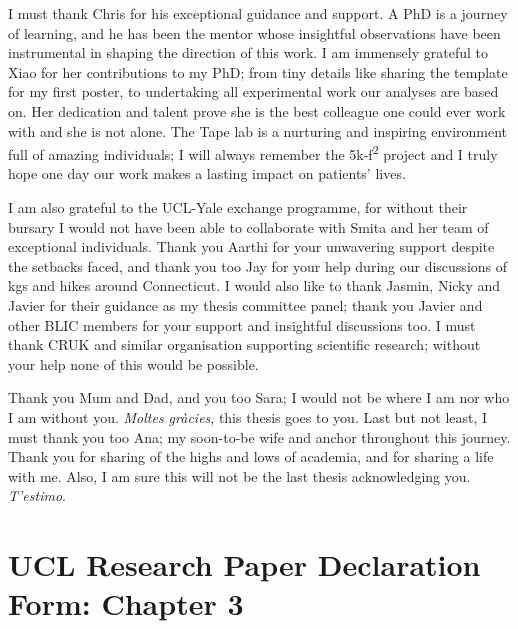         
\begin{acknowledgements}

I must thank Chris for his exceptional guidance and support. A PhD is a journey of learning, and he has been the mentor whose insightful observations have been instrumental in shaping the direction of this work.
I am immensely grateful to Xiao for her contributions to my PhD; from tiny details like sharing the template for my first poster, to undertaking all experimental work our analyses are based on. Her dedication and talent prove she is the best colleague one could ever work with and she is not alone. The Tape lab is a nurturing and inspiring environment full of amazing individuals; I will always remember the 5k-f\textsuperscript{2} project and I truly hope one day our work makes a lasting impact on patients' lives. 

I am also grateful to the UCL-Yale exchange programme, for without their bursary I would not have been able to collaborate with Smita and her team of exceptional individuals. Thank you Aarthi for your unwavering support despite the setbacks faced, and thank you too Jay for your help during our discussions of \acrshort{kg}s and hikes around Connecticut. 
I would also like to thank Jasmin, Nicky and Javier for their guidance as my thesis committee panel; thank you Javier and other BLIC members for your support and insightful discussions too.
I must thank CRUK and similar organisation supporting scientific research; without your help none of this would be possible.

Thank you Mum and Dad, and you too Sara; I would not be where I am nor who I am without you. \emph{Moltes gràcies}, this thesis goes to you. Last but not least, I must thank you too Ana; my soon-to-be wife and anchor throughout this journey. Thank you for sharing of the highs and lows of academia, and for sharing a life with me. Also, I am sure this will not be the last thesis acknowledging you. \emph{T'estimo}.

\end{acknowledgements}


\newpage	
\section*{UCL Research Paper Declaration Form: Chapter 3}

